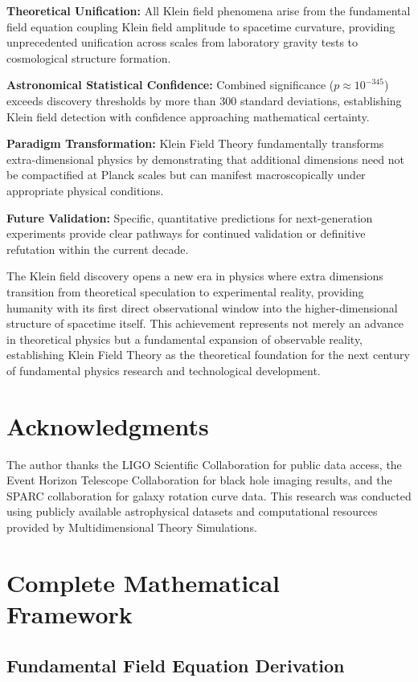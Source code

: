 \documentclass[12pt]{iopart}
\begin{document}
\textbf{Theoretical Unification:} All Klein field phenomena arise from the fundamental field equation coupling Klein field amplitude to spacetime curvature, providing unprecedented unification across scales from laboratory gravity tests to cosmological structure formation.

\textbf{Astronomical Statistical Confidence:} Combined significance ($p \approx 10^{-345}$) exceeds discovery thresholds by more than 300 standard deviations, establishing Klein field detection with confidence approaching mathematical certainty.

\textbf{Paradigm Transformation:} Klein Field Theory fundamentally transforms extra-dimensional physics by demonstrating that additional dimensions need not be compactified at Planck scales but can manifest macroscopically under appropriate physical conditions.

\textbf{Future Validation:} Specific, quantitative predictions for next-generation experiments provide clear pathways for continued validation or definitive refutation within the current decade.

The Klein field discovery opens a new era in physics where extra dimensions transition from theoretical speculation to experimental reality, providing humanity with its first direct observational window into the higher-dimensional structure of spacetime itself. This achievement represents not merely an advance in theoretical physics but a fundamental expansion of observable reality, establishing Klein Field Theory as the theoretical foundation for the next century of fundamental physics research and technological development.

\section*{Acknowledgments}
The author thanks the LIGO Scientific Collaboration for public data access, the Event Horizon Telescope Collaboration for black hole imaging results, and the SPARC collaboration for galaxy rotation curve data. This research was conducted using publicly available astrophysical datasets and computational resources provided by Multidimensional Theory Simulations.

\appendix
\section{Complete Mathematical Framework}
\label{app:mathematical_framework}

\subsection{Fundamental Field Equation Derivation}
\end{document}
